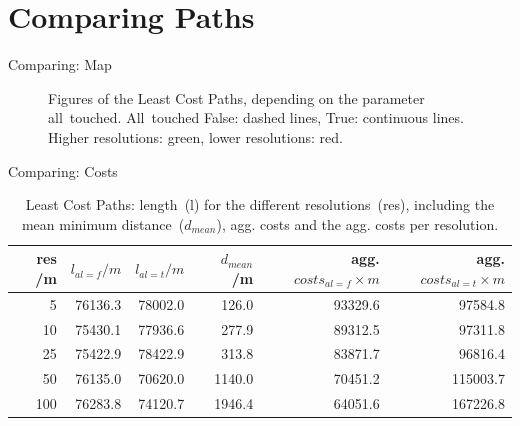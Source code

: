 \documentclass[usenames,dvipsnames,aspectratio=169]{beamer}
\begin{document}
	\section{Comparing Paths}
	\begin{frame}{Comparing: Map}
		\begin{figure}
			\centering
			
			\qquad
			
			\caption{Figures of the Least Cost Paths, depending on the parameter all~touched. All~touched False: dashed lines, True: continuous lines. Higher resolutions: green, lower resolutions: red.}
			\label{fig:paths_alltouched}
		\end{figure}
	\end{frame}

	\begin{frame}{Comparing: Costs}
		\begin{table}[t]
			\caption{Least Cost Paths: length~(l) for the different resolutions~(res), including the mean minimum distance~($d_{mean}$), agg. costs and the agg. costs per resolution.} 
			\label{tab:2}
			\centering
			\begin{tabular}{ r  r  r  r  r  r   }
				res /m & $l_{al=f} /m$ & $l_{al=t} /m$ & $d_{mean}$ /m  & agg. $costs_{al=f} \times m$ & agg. $costs_{al=t} \times m$ \\
				\hline
				5 	& 76136.3	& 78002.0 &  126.0  & 93329.6 &  97584.8 \\
				10 	& 75430.1 	& 77936.6 &  277.9  & 89312.5 &  97311.8 \\
				25 	& 75422.9 	& 78422.9 &  313.8  & 83871.7 &  96816.4 \\
				50 	& 76135.0	& 70620.0 & 1140.0  & 70451.2 & 115003.7 \\
				100 & 76283.8	& 74120.7 & 1946.4  & 64051.6 & 167226.8 \\
			\end{tabular}
		\end{table}
	\end{frame}
\end{document}
